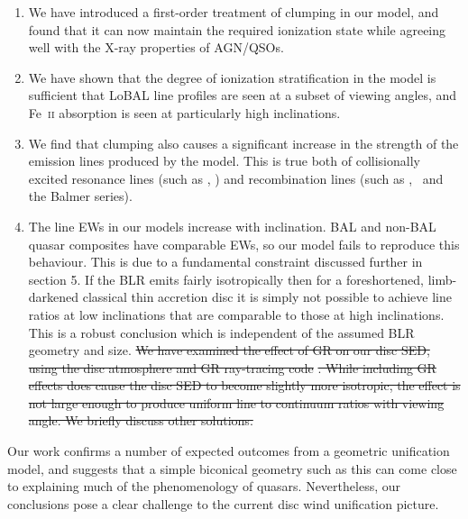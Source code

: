 \documentclass[preprint, a4paper, 11pt]{aastex}
\providecommand{\DIFdel}[1]{{\protect\color{red}\sout{#1}}}                      %
\providecommand{\DIFdelbegin}{} %
\providecommand{\DIFdelend}{} %
\begin{document}
\begin{enumerate}
\item We have introduced a first-order treatment 
of clumping in our model, and found that it can now maintain
the required ionization state while agreeing well with the X-ray
properties of AGN/QSOs.
\smallskip
\item We have shown that the degree of ionization stratification
in the model is sufficient that LoBAL line profiles
are seen at a subset of viewing angles, and Fe~\textsc{ii}
absorption is seen at particularly high inclinations.
\smallskip
\item We find that clumping also causes a significant 
increase in the strength of the  emission
lines produced by the model. This is true both
of collisionally excited resonance lines (such as \civ, \nv)
and recombination lines (such as \la, \ha\ and the Balmer series).
\smallskip
\item The line EWs in our models increase with inclination.
BAL and non-BAL quasar composites have comparable EWs, so our model
fails to reproduce this behaviour.
This is due to a fundamental constraint discussed further in section 5. If the BLR
emits fairly isotropically then for a foreshortened, limb-darkened classical thin accretion disc
it is simply not possible to achieve line ratios at low inclinations that are comparable to
those at high inclinations. This is a robust conclusion which 
is independent of the assumed BLR geometry and size.
\DIFdelbegin %
\DIFdel{We have examined the effect of GR on our disc SED, using the disc atmosphere
and GR ray-tracing code }%
\DIFdel{. While including GR effects
does cause the disc SED to become slightly more isotropic,
the effect is not large enough to produce uniform line to continuum ratios
with viewing angle. We briefly discuss other solutions.
}\DIFdelend %
\end{enumerate}
Our work confirms a number of expected outcomes from a geometric unification 
model, and suggests that a simple biconical geometry such as this can come close to 
explaining much of the  phenomenology of quasars. Nevertheless, our conclusions pose 
a clear challenge to the current disc wind unification picture.
\end{document}
